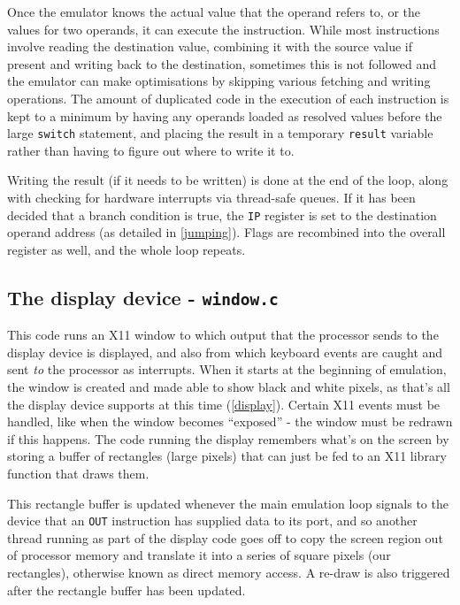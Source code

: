 \documentclass[12pt,a4paper]{report}
\begin{document}
Once the emulator knows the actual value that the operand refers to, or the values for two operands, it can execute the instruction. While most instructions involve reading the destination value, combining it with the source value if present and writing back to the destination, sometimes this is not followed and the emulator can make optimisations by skipping various fetching and writing operations. The amount of duplicated code in the execution of each instruction is kept to a minimum by having any operands loaded as resolved values before the large \texttt{switch} statement, and placing the result in a temporary \texttt{result} variable rather than having to figure out where to write it to.

Writing the result (if it needs to be written) is done at the end of the loop, along with checking for hardware interrupts via thread-safe queues. If it has been decided that a branch condition is true, the \texttt{IP} register is set to the destination operand address (as detailed in \autoref{jumping}). Flags are recombined into the overall register as well, and the whole loop repeats.

\subsection*{The display device - \texttt{window.c}}

This code runs an X11 window to which output that the processor sends to the display device is displayed, and also from which keyboard events are caught and sent \emph{to} the processor as interrupts. When it starts at the beginning of emulation, the window is created and made able to show black and white pixels, as that's all the display device supports at this time (\autoref{display}). Certain X11 events must be handled, like when the window becomes ``exposed'' - the window must be redrawn if this happens. The code running the display remembers what's on the screen by storing a buffer of rectangles (large pixels) that can just be fed to an X11 library function that draws them.

This rectangle buffer is updated whenever the main emulation loop signals to the device that an \texttt{OUT} instruction has supplied data to its port, and so another thread running as part of the display code goes off to copy the screen region out of processor memory and translate it into a series of square pixels (our rectangles), otherwise known as direct memory access. A re-draw is also triggered after the rectangle buffer has been updated.
\end{document}
